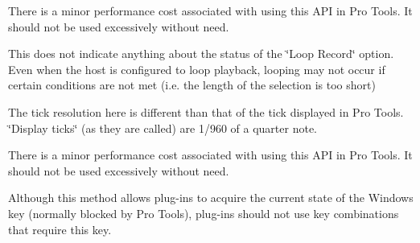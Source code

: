 \begin{DoxyRefList}
\begin{DoxyItemize}
\end{DoxyItemize}
\item[Member \mbox{\hyperlink{a02352_a51aebee28b9d285863c3527e936dd733}{AAX\+\_\+\+ITransport\+::Get\+Bar\+Beat\+Position}} (int32\+\_\+t $\ast$\+Bars, int32\+\_\+t $\ast$\+Beats, int64\+\_\+t $\ast$\+Display\+Ticks, int64\+\_\+t Sample\+Location) const =0]\label{a00879__compatibility_notes000060}%
%
 There is a minor performance cost associated with using this API in Pro Tools. It should not be used excessively without need. 
\item[Member \mbox{\hyperlink{a02352_a386bade7d8902130a02c6e6dc8b2123b}{AAX\+\_\+\+ITransport\+::Get\+Current\+Loop\+Position}} (bool $\ast$b\+Looping, int64\+\_\+t $\ast$\+Loop\+Start\+Tick, int64\+\_\+t $\ast$\+Loop\+End\+Tick) const =0]\label{a00879__compatibility_notes000058}%
%
 This does not indicate anything about the status of the \char`\"{}\+Loop Record\char`\"{} option. Even when the host is configured to loop playback, looping may not occur if certain conditions are not met (i.\+e. the length of the selection is too short) 
\item[Member \mbox{\hyperlink{a02352_a2d99dca311ddca98c4d455078edd42d5}{AAX\+\_\+\+ITransport\+::Get\+Current\+Tick\+Position}} (int64\+\_\+t $\ast$\+Tick\+Position) const =0]\label{a00879__compatibility_notes000057}%
%
 The tick resolution here is different than that of the tick displayed in Pro Tools. \char`\"{}\+Display ticks\char`\"{} (as they are called) are 1/960 of a quarter note. 
\item[Member \mbox{\hyperlink{a02352_a85aae48051f8596e8145268ecf173dcb}{AAX\+\_\+\+ITransport\+::Get\+Custom\+Tick\+Position}} (int64\+\_\+t $\ast$o\+Tick\+Position, int64\+\_\+t i\+Sample\+Location) const =0]\label{a00879__compatibility_notes000059}%
%
 There is a minor performance cost associated with using this API in Pro Tools. It should not be used excessively without need. 
\item[Member \mbox{\hyperlink{a02356_ac2fe16f6d81a8d941e36242d9f9d0980}{AAX\+\_\+\+IView\+Container\+::Get\+Modifiers}} (uint32\+\_\+t $\ast$out\+Modifiers)=0]\label{a00879__compatibility_notes000061}%
%
 Although this method allows plug-\/ins to acquire the current state of the Windows key (normally blocked by Pro Tools), plug-\/ins should not use key combinations that require this key. 

\end{DoxyRefList}
